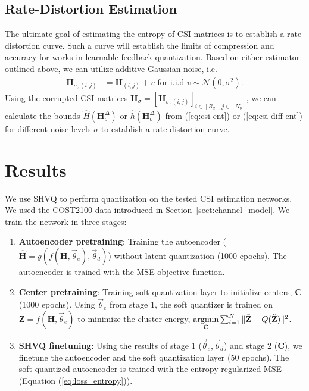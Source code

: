 \subsection{Rate-Distortion Estimation} \label{sec:rd_quant}

The ultimate goal of estimating the entropy of CSI matrices is to establish a rate-distortion curve. Such a curve will establish the limits of compression and accuracy for works in learnable feedback quantization. Based on either estimator outlined above, we can utilize additive Gaussian noise, i.e.
\begin{align*}
	\mathbf H_{\sigma,(i,j)} &= \mathbf H_{(i,j)} + v \text{ for i.i.d } v \sim \mathcal{N}(0,\sigma^2).
\end{align*}
Using the corrupted CSI matrices $\mathbf H_{\sigma}=\left[\mathbf H_{\sigma,(i,j)}\right]_{i\in [R_d],j\in [N_b]}$, we can calculate the bounds $\hat H(\mathbf H_{\sigma}^\Delta)$ or $\hat h(\mathbf H_{\sigma}^\Delta)$ from (\ref{eq:csi-ent}) or (\ref{eq:csi-diff-ent}) for different noise levels $\sigma$ to establish a rate-distortion curve.

\section{Results}

We use SHVQ \cite{ref:Agustsson2017SoftToHard} to perform quantization on the tested CSI estimation networks. We used the COST2100 data introduced in Section~\ref{sect:channel_model}. We train the network in three stages:
\begin{enumerate}
	\item \textbf{Autoencoder pretraining}: Training the autoencoder ($\hat{\mathbf{H}}=g(f(\mathbf H, \vec\theta_e), \vec\theta_d)$) without latent quantization (1000 epochs). The autoencoder is trained with the MSE objective function.
	\item \textbf{Center pretraining}: Training soft quantization layer to initialize centers, $\mathbf C$ (1000 epochs). Using $\vec \theta_e$ from stage 1, the soft quantizer is trained on $\mathbf Z=f(\mathbf H, \vec \theta_e)$ to minimize the cluster energy, $\underset{\mathbf C}{\text{argmin}}\sum_{i=1}^N \Arrowvert \tilde{\mathbf Z} - Q(\tilde{\mathbf Z})\Arrowvert^2$.
	\item \textbf{SHVQ finetuning}: Using the results of stage 1 ($\vec\theta_e, \vec\theta_d$) and stage 2 ($\mathbf C$), we finetune the autoencoder and the soft quantization layer (50 epochs). The soft-quantized autoencoder is trained with the entropy-regularized MSE (Equation (\ref{eq:loss_entropy})).
\end{enumerate}

